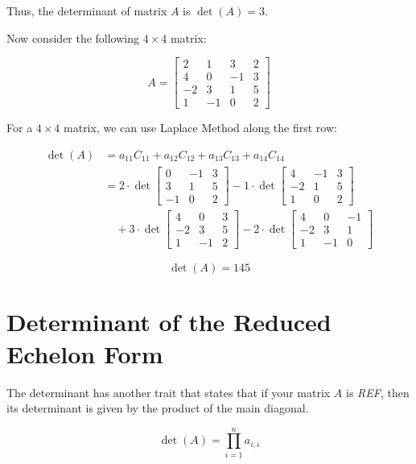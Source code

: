 Thus, the determinant of matrix \(A\) is \(\det(A) = 3\).

Now consider the following \(4 \times 4\) matrix:

\[
    A =
    \begin{bmatrix}
        2  & 1  & 3  & 2 \\
        4  & 0  & -1 & 3 \\
        -2 & 3  & 1  & 5 \\
        1  & -1 & 0  & 2
    \end{bmatrix}
\]

For a \(4 \times 4\) matrix, we can use Laplace Method along the first row:

\begin{align*}
    \det(A) & = a_{11}C_{11} + a_{12}C_{12} + a_{13}C_{13} + a_{14}C_{14}                             \\
            & = 2 \cdot \det\begin{bmatrix} 0 & -1 & 3 \\ 3 & 1 & 5 \\ -1 & 0 & 2 \end{bmatrix}
    - 1 \cdot \det\begin{bmatrix} 4 & -1 & 3 \\ -2 & 1 & 5 \\ 1 & 0 & 2 \end{bmatrix}                 \\
            & \quad + 3 \cdot \det\begin{bmatrix} 4 & 0 & 3 \\ -2 & 3 & 5 \\ 1 & -1 & 2 \end{bmatrix}
    - 2 \cdot \det\begin{bmatrix} 4 & 0 & -1 \\ -2 & 3 & 1 \\ 1 & -1 & 0 \end{bmatrix}
\end{align*}

\[
    \det(A) = 145
\]

\section{Determinant of the Reduced Echelon Form}

The determinant has another trait that states that if your matrix \(A\) is \emph{REF}, then
its determinant is given by the product of the main diagonal.

\[
    \det(A) = \prod_{i = 1}^{n} a_{i, i}
\]

